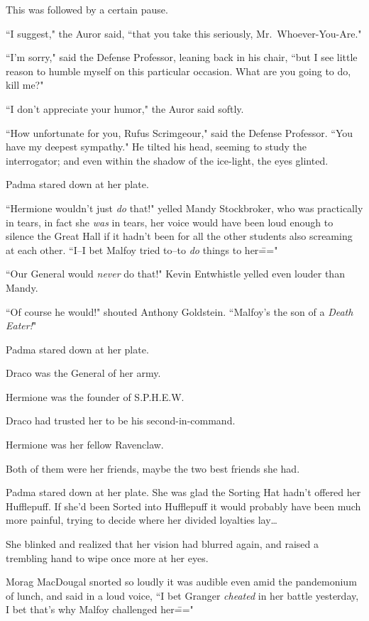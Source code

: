 This was followed by a certain pause.

``I suggest," the Auror said, ``that you take this seriously, Mr.~Whoever-You-Are."

``I'm sorry," said the Defense Professor, leaning back in his chair, ``but I see little reason to humble myself on this particular occasion. What are you going to do, kill me?"

``I don't appreciate your humor," the Auror said softly.

``How unfortunate for you, Rufus Scrimgeour," said the Defense Professor. ``You have my deepest sympathy." He tilted his head, seeming to study the interrogator; and even within the shadow of the ice-light, the eyes glinted.

\later

Padma stared down at her plate.

``Hermione wouldn't just \emph{do} that!" yelled Mandy Stockbroker, who was practically in tears, in fact she \emph{was} in tears, her voice would have been loud enough to silence the Great Hall if it hadn't been for all the other students also screaming at each other. ``I\---I bet Malfoy tried to\---to \emph{do} things to her\==="

``Our General would \emph{never} do that!" Kevin Entwhistle yelled even louder than Mandy.

``Of course he would!" shouted Anthony Goldstein. ``Malfoy's the son of a \emph{Death Eater!}"

Padma stared down at her plate.

Draco was the General of her army.

Hermione was the founder of S.P.H.E.W.

Draco had trusted her to be his second-in-command.

Hermione was her fellow Ravenclaw.

Both of them were her friends, maybe the two best friends she had.

Padma stared down at her plate. She was glad the Sorting Hat hadn't offered her Hufflepuff. If she'd been Sorted into Hufflepuff it would probably have been much more painful, trying to decide where her divided loyalties lay{\ldots}

She blinked and realized that her vision had blurred again, and raised a trembling hand to wipe once more at her eyes.

Morag MacDougal snorted so loudly it was audible even amid the pandemonium of lunch, and said in a loud voice, ``I bet Granger \emph{cheated} in her battle yesterday, I bet that's why Malfoy challenged her\==="

